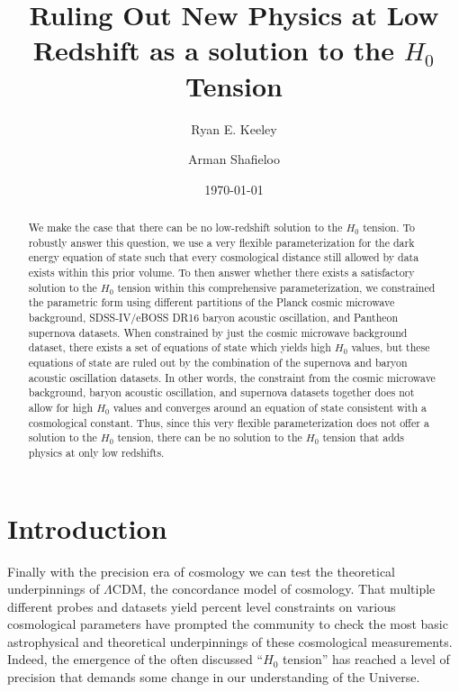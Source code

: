 \documentclass[
 reprint,
 amsmath,amssymb,
 aps,
]{revtex4-2}
\begin{document}

\title{Ruling Out New Physics at Low Redshift as a solution to the $H_0$ Tension}

\author{Ryan E. Keeley}
\author{Arman Shafieloo}




\date{\today}

\begin{abstract} 
We make the case that there can be no low-redshift solution to the $H_0$ tension. To robustly answer this question, we use a very flexible parameterization for the dark energy equation of state such that every cosmological distance still allowed by data exists within this prior volume. To then answer whether there exists a satisfactory solution to the $H_0$ tension within this comprehensive parameterization, we constrained the parametric form using different partitions of the Planck cosmic microwave background, SDSS-IV/eBOSS DR16 baryon acoustic oscillation, and Pantheon supernova datasets. When constrained by just the cosmic microwave background dataset, there exists a set of equations of state which yields high $H_0$ values, but these equations of state are ruled out by the combination of the supernova and baryon acoustic oscillation datasets. In other words, the constraint from the cosmic microwave background, baryon acoustic oscillation, and supernova datasets together does not allow for high $H_0$ values and converges around an equation of state consistent with a cosmological constant. Thus, since this very flexible parameterization does not offer a solution to the $H_0$ tension, there can be no solution to the $H_0$ tension that adds physics at only low redshifts. 
\end{abstract}

\maketitle


\section{Introduction}
Finally with the precision era of cosmology we can test the theoretical underpinnings of $\Lambda$CDM, the concordance model of cosmology. That multiple different probes and datasets yield percent level constraints on various cosmological parameters have prompted the community to check the most basic astrophysical and theoretical underpinnings of these cosmological measurements.  Indeed, the emergence of the often discussed ``$H_0$ tension'' has reached a level of precision that demands some change in our understanding of the Universe. 
\end{document}
